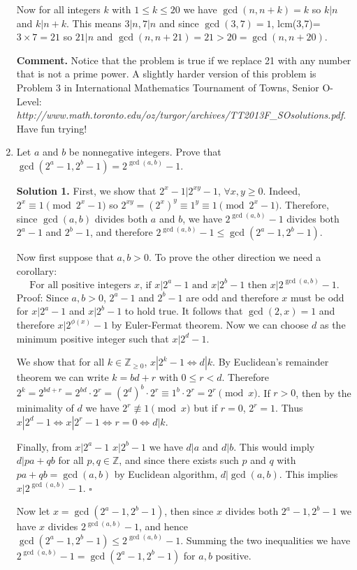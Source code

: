 \documentclass[11pt]{article}
\begin{document}
\begin{enumerate}
Now for all integers $k$ with $1\le k\le 20$ we have $\gcd (n,n+k)=k$ so $k|n$ and $k|n+k$. This means $3|n, 7|n$ and since $\gcd (3,7)=1$, lcm(3,7)=$3\times 7=21$ so $21|n$ and $\gcd (n, n+21)=21>20=\gcd (n, n+20)$. 

\textbf {Comment.} Notice that the problem is true if we replace 21 with any number that is not a prime power. A slightly harder version of this problem is Problem 3 in International Mathematics Tournament of Towns, Senior O-Level:\\ \emph{http://www.math.toronto.edu/oz/turgor/archives/TT2013F\_SOsolutions.pdf}. Have fun trying!

\item Let $a$ and $b$ be nonnegative integers. Prove that $\gcd (2^a-1, 2^b-1)=2^{\gcd (a, b)}-1$.

\textbf {Solution 1.} First, we show that $2^x-1|2^{xy}-1$, $\forall x, y\ge 0$. Indeed, $2^x\equiv 1\pmod {2^x-1}$ so $2^{xy}=(2^x)^{y}\equiv 1^y\equiv 1\pmod {2^x-1}$. Therefore, since $\gcd (a,b)$ divides both $a$ and $b$, we have $2^{\gcd(a,b)}-1$ divides both $2^a-1$ and $2^b-1$, and therefore $2^{\gcd (a,b)}-1\le \gcd (2^a-1, 2^b-1)$.

Now first suppose that $a,b>0$. To prove the other direction we need a corollary:
$$\text{For all positive integers $x$, if $x|2^a-1$ and $x|2^b-1$ then $x|2^{\gcd (a,b)}-1$.} $$
Proof: Since $a,b>0$, $2^a-1$ and $2^b-1$ are odd and therefore $x$ must be odd for $x|2^a-1$ and $x|2^b-1$ to hold true. It follows that $\gcd (2, x)=1$ and therefore $x|2^{\phi (x)}-1$ by Euler-Fermat theorem. Now we can choose $d$ as the minimum positive integer such that $x|2^d-1$. 

We show that for all $k\in\mathbb{Z}_{\ge 0}$, $x|2^k-1\Leftrightarrow d|k$. By Euclidean's remainder theorem we can write $k=bd+r$ with $0\le r<d$. Therefore $2^k=2^{bd+r} = 2^{bd}\cdot 2^r = (2^d)^b\cdot 2^r \equiv 1^b\cdot 2^r=2^r\pmod {x}$. If $r>0$, then by the minimality of $d$ we have $2^r\not\equiv 1\pmod {x}$ but if $r=0$, $2^r=1$. Thus $x|2^d-1\Leftrightarrow x|2^r-1\Leftrightarrow r=0\Leftrightarrow d|k$.

Finally, from $x|2^a-1$ $x|2^b-1$ we have $d|a$ and $d|b$. This would imply $d|pa+qb$ for all $p,q\in\mathbb{Z}$, and since there exists such $p$ and $q$ with $pa+qb=\gcd (a,b)$ by Euclidean algorithm, $d|\gcd (a,b)$. This implies $x|2^{\gcd(a,b)}-1$. $\square$

Now let $x=\gcd (2^a-1, 2^b-1)$, then since $x$ divides both $2^a-1, 2^b-1$ we have $x$ divides $2^{\gcd (a,b)}-1$, and hence $\gcd (2^a-1, 2^b-1)\le 2^{\gcd (a,b)}-1$. Summing the two inequalities we have $2^{\gcd (a,b)}-1= \gcd (2^a-1, 2^b-1)$ for $a,b$ positive.


\end{enumerate}
\end{document}
